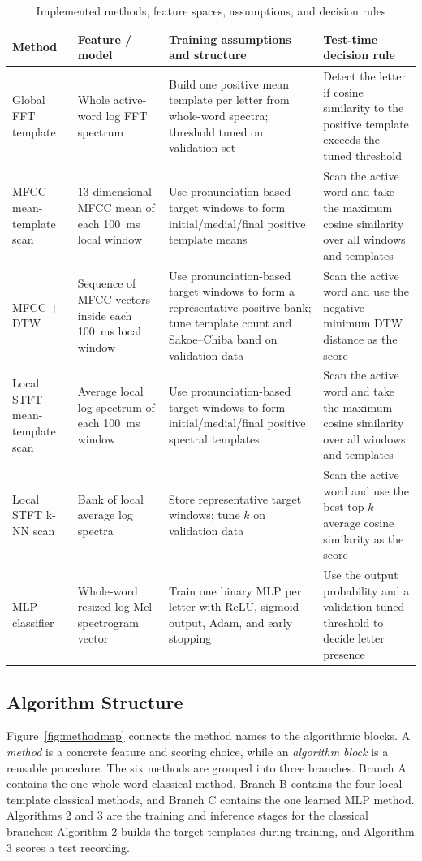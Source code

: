 \documentclass[conference]{IEEEtran}
\begin{document}
\begin{table}[t]
    \centering
    \caption{Implemented methods, feature spaces, assumptions, and decision rules}
    \label{tab:structures}
    \begin{tabular}{p{2.4cm}p{3.2cm}p{4.7cm}p{5.1cm}}
        \toprule
        Method & Feature / model & Training assumptions and structure & Test-time decision rule \\
        \midrule
        Global FFT template & Whole active-word log FFT spectrum & Build one positive mean template per letter from whole-word spectra; threshold tuned on validation set & Detect the letter if cosine similarity to the positive template exceeds the tuned threshold \\
        \midrule
        MFCC mean-template scan & 13-dimensional MFCC mean of each 100~ms local window & Use pronunciation-based target windows to form initial/medial/final positive template means & Scan the active word and take the maximum cosine similarity over all windows and templates \\
        \midrule
        MFCC + DTW & Sequence of MFCC vectors inside each 100~ms local window & Use pronunciation-based target windows to form a representative positive bank; tune template count and Sakoe--Chiba band on validation data & Scan the active word and use the negative minimum DTW distance as the score \\
        \midrule
        Local STFT mean-template scan & Average local log spectrum of each 100~ms window & Use pronunciation-based target windows to form initial/medial/final positive spectral templates & Scan the active word and take the maximum cosine similarity over all windows and templates \\
        \midrule
        Local STFT k-NN scan & Bank of local average log spectra & Store representative target windows; tune $k$ on validation data & Scan the active word and use the best top-$k$ average cosine similarity as the score \\
        \midrule
        MLP classifier & Whole-word resized log-Mel spectrogram vector & Train one binary MLP per letter with ReLU, sigmoid output, Adam, and early stopping & Use the output probability and a validation-tuned threshold to decide letter presence \\
        \bottomrule
    \end{tabular}
\end{table}

\subsection{Algorithm Structure}
Figure~\ref{fig:methodmap} connects the method names to the algorithmic blocks. A \emph{method} is a concrete feature and scoring choice, while an \emph{algorithm block} is a reusable procedure. The six methods are grouped into three branches. Branch A contains the one whole-word classical method, Branch B contains the four local-template classical methods, and Branch C contains the one learned MLP method. Algorithms 2 and 3 are the training and inference stages for the classical branches: Algorithm 2 builds the target templates during training, and Algorithm 3 scores a test recording.
\end{document}
